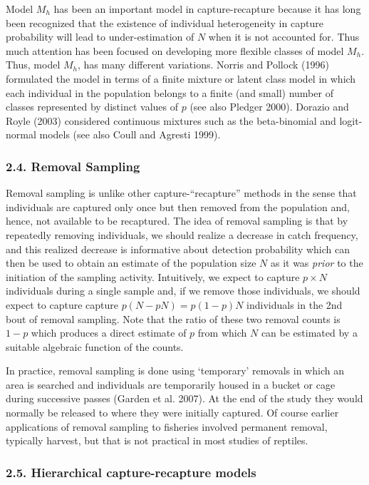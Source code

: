 \documentclass{book}
\begin{document}
Model $M_h$ has been an important model in capture-recapture because
it has long been recognized that the existence of individual
heterogeneity in capture probability will lead to under-estimation of
$N$ when it is not accounted for.  Thus much attention has been
focused on developing more flexible classes of model $M_h$.  Thus,
model $M_h$, has many different variations. Norris and Pollock (1996)
formulated the model in terms of a finite mixture or latent class
model in which each individual in the population belongs to a finite
(and small) number of classes represented by distinct values of $p$
(see also Pledger 2000). Dorazio and Royle (2003) considered
continuous mixtures such as the beta-binomial and logit-normal models
(see also Coull and Agresti 1999).

\subsubsection*{2.4. Removal Sampling}

Removal sampling is unlike other capture-``recapture'' methods in the
sense that individuals are captured only once but then removed from
the population and, hence, not available to be recaptured. The idea of
removal sampling is that by repeatedly removing individuals, we should
realize a decrease in catch frequency, and this realized decrease is
informative about detection probability which can then be used to
obtain an estimate of the population size $N$ as it was {\it prior} to
the initiation of the sampling activity. Intuitively, we expect to
capture $p \times N$ individuals during a single sample and, if we
remove those individuals, we should expect to capture capture $p
(N - p N) = p(1-p) N$ individuals in the 2nd bout of
removal sampling. Note that the ratio of these two removal counts is
$1-p$ which produces a direct estimate of $p$ from which $N$ can be
estimated by a suitable algebraic function of the counts.

In practice, removal sampling is done using `temporary' removals in
which an area is searched and individuals are temporarily housed in a
bucket or cage during successive passes (Garden et al. 2007). At the
end of the study they would normally be released to where they were
initially captured. Of course earlier applications of removal sampling
to fisheries involved permanent removal, typically harvest, but that
is not practical in most studies of reptiles.

\subsubsection*{2.5. Hierarchical capture-recapture models}
\end{document}

